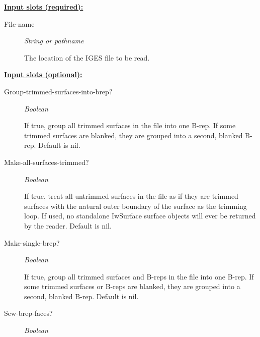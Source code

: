\documentclass [11pt]{book}
\begin{document}
\begin{itemize}
\begin{description}
\end{description}








\textbf{
\underline{Input slots (required):}}

\begin{description}

\item [File-name]
\emph{String or pathname}

 The location of the IGES file to be read.




\end{description}






\textbf{
\underline{Input slots (optional):}}

\begin{description}

\item [Group-trimmed-surfaces-into-brep?]
\emph{Boolean}

 If true, group all trimmed surfaces in the file into one B-rep.
If some trimmed surfaces are blanked, they are grouped into a second, blanked B-rep. Default is nil.




\item [Make-all-surfaces-trimmed?]
\emph{Boolean}

 If true, treat all untrimmed surfaces in the file as if they are trimmed surfaces with
the natural outer boundary of the surface as the trimming loop.  If used, no standalone IwSurface surface objects
will ever be returned by the reader.  Default is nil.




\item [Make-single-brep?]
\emph{Boolean}

 If true, group all trimmed surfaces and B-reps in the file into one B-rep.
If some trimmed surfaces or B-reps are blanked, they are grouped into a second, blanked B-rep. Default is nil.




\item [Sew-brep-faces?]
\emph{Boolean}


\end{description}
\end{itemize}
\end{document}

